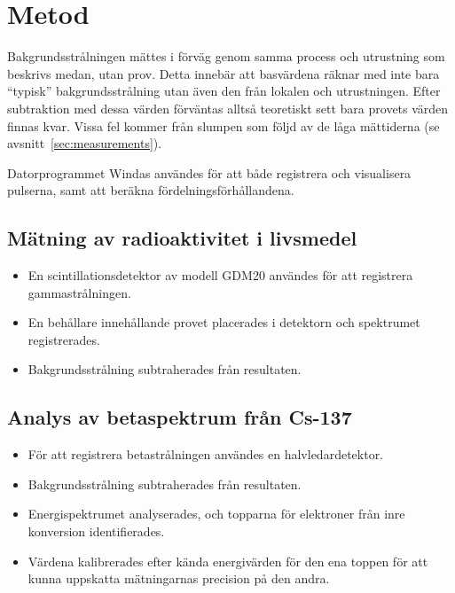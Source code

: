 \section{Metod} \label{sec:method}

Bakgrundsstrålningen mättes i förväg genom samma process och utrustning som
beskrivs medan, utan prov. Detta innebär att basvärdena räknar med inte bara
``typisk'' bakgrundsstrålning utan även den från lokalen och utrustningen.
Efter subtraktion med dessa värden förväntas alltså teoretiskt sett bara
provets värden finnas kvar. Vissa fel kommer från slumpen som följd av de låga
mättiderna (se avsnitt~\ref{sec:measurements}).

Datorprogrammet Windas användes för att både registrera och visualisera
pulserna, samt att beräkna fördelningsförhållandena.

\subsection{Mätning av radioaktivitet i livsmedel}

\begin{itemize}
    \item En scintillationsdetektor av modell GDM20 användes för att registrera
    gammastrålningen.

    \item En behållare innehållande provet placerades i detektorn och
    spektrumet registrerades.

    \item Bakgrundsstrålning subtraherades från resultaten.
\end{itemize}

\subsection{Analys av betaspektrum från Cs-137}

\begin{itemize}
    \item För att registrera betastrålningen användes en halvledardetektor.

    \item Bakgrundsstrålning subtraherades från resultaten.

    \item Energispektrumet analyserades, och topparna för elektroner från inre 
    konversion identifierades.

    \item Värdena kalibrerades efter kända energivärden för den ena toppen för
    att kunna uppskatta mätningarnas precision på den andra.
\end{itemize}
